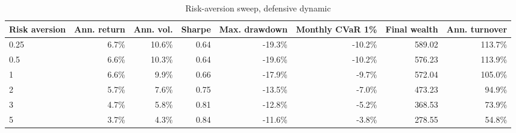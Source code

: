 ﻿\begin{table}[H]
\centering
\caption{Risk-aversion sweep, defensive dynamic}
\label{tab:allocation-risk-aversion-defensive}
\small
\begin{adjustbox}{max width=\linewidth}
\begin{tabular}{lrrrrrrr}
\toprule
Risk aversion & Ann. return & Ann. vol. & Sharpe & Max. drawdown & Monthly CVaR 1\% & Final wealth & Ann. turnover \\
\midrule
0.25 & 6.7\% & 10.6\% & 0.64 & -19.3\% & -10.2\% & 589.02 & 113.7\% \\
0.5 & 6.6\% & 10.3\% & 0.64 & -19.6\% & -10.2\% & 576.23 & 113.9\% \\
1 & 6.6\% & 9.9\% & 0.66 & -17.9\% & -9.7\% & 572.04 & 105.0\% \\
2 & 5.7\% & 7.6\% & 0.75 & -13.5\% & -7.0\% & 473.23 & 94.9\% \\
3 & 4.7\% & 5.8\% & 0.81 & -12.8\% & -5.2\% & 368.53 & 73.9\% \\
5 & 3.7\% & 4.3\% & 0.84 & -11.6\% & -3.8\% & 278.55 & 54.8\% \\
\bottomrule
\end{tabular}
\end{adjustbox}
\end{table}


